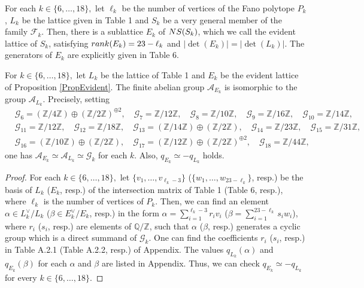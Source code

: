 \documentclass[10pt,a4paper]{amsart}
\begin{document}
\begin{prop}\label{PropEvident}
For each $k\in \{6,\ldots, 18\},$
let $\ell_k$ be the number of  vertices of the Fano polytope  $P_k$,
 $L_k$ be the lattice given in Table 1
 and $S_k$ be a very general member of the family $\mathscr{F}_k$.
Then, there is a sublattice $E_k$ of ${\rm NS}(S_k)$,
which we call the evident lattice of  $S_k$,
satisfying ${\rm rank} (E_k) =23 - \ell_k$ and $|\det (E_k)| = |\det(L_k)|.$
The generators of $E_k$ are explicitly  given in Table 6.
\end{prop}

\begin{lem}\label{LemFinAbel}
For $k\in\{6,\ldots, 18\},$ let $L_k$ be the lattice of Table 1 and $E_k$ be the evident lattice of Proposition \ref{PropEvident}.
The finite abelian group $\mathscr{A}_{E_k}$ is isomorphic to the group $\mathscr{A}_{L_k}.$ 
Precisely,  setting  
\begin{align*}
& 
\mathcal{G}_6=(\mathbb{Z}/4\mathbb{Z})\oplus (\mathbb{Z}/2\mathbb{Z})^{ \oplus 2} ,\quad 
\mathcal{G}_7=\mathbb{Z}/12 \mathbb{Z}, \quad
\mathcal{G}_8 = \mathbb{Z}/10 \mathbb{Z}, \quad 
\mathcal{G}_9 =\mathbb{Z}/16 \mathbb{Z}, \quad
\mathcal{G}_{10}=\mathbb{Z}/14 \mathbb{Z},
\\
&
\mathcal{G}_{11}=\mathbb{Z}/12 \mathbb{Z}, \quad
\mathcal{G}_{12}=\mathbb{Z}/18 \mathbb{Z}, \quad
\mathcal{G}_{13}=(\mathbb{Z}/14 \mathbb{Z})\oplus (\mathbb{Z}/2 \mathbb{Z}), \quad
\mathcal{G}_{14}=\mathbb{Z}/23 \mathbb{Z},\quad
\mathcal{G}_{15}=\mathbb{Z}/31 \mathbb{Z},\\
&
\mathcal{G}_{16}=(\mathbb{Z}/10\mathbb{Z})\oplus (\mathbb{Z}/2 \mathbb{Z}),\quad
\mathcal{G}_{17}=(\mathbb{Z}/12 \mathbb{Z}) \oplus (\mathbb{Z}/2 \mathbb{Z})^{\oplus 2}, \quad
\mathcal{G}_{18}=\mathbb{Z}/44 \mathbb{Z},
\end{align*}
one has $\mathscr{A}_{E_k} \simeq \mathscr{A}_{L_k} \simeq \mathcal{G}_k$ for each $k$.
Also,  $q_{E_k} \simeq - q_{L_k}$ holds.
\end{lem}

\begin{proof}
For each $k\in\{6,\ldots, 18\},$
let $\{v_1,\ldots,v_{\ell_k-3}\}$ ($\{w_1,\ldots,w_{23-\ell_k}\}$,  resp.)  be the basis of $L_k$  ($E_k$, resp.)
of the intersection matrix of Table 1 
(Table 6, resp.),
where $\ell_k$ is the number of vertices of $P_k$.
Then, we can find an element 
$\alpha \in L_k^\vee / L_k$ 
($\beta\in E_k^\vee/E_k$, resp.) 
in the form
$\alpha = \sum_{i=1}^{\ell_k-3} r_i v_i $
($\beta = \sum_{i=1}^{23-\ell_k} s_i w_i $),
where $r_i$ ($s_i$, resp.) are elements of $\mathbb{Q}/\mathbb{Z}$,
such that $\alpha $ ($\beta$, resp.) generates a cyclic group which is a direct summand of $\mathcal{G}_k$.
One can find the coefficients $r_i$ ($s_i$, resp.) in Table A.2.1 (Table A.2.2, resp.) of Appendix.
The values $q_{L_k}(\alpha)$ and $q_{E_k}(\beta)$ for each $\alpha$ and $\beta$ are listed in Appendix.
Thus, we can check $q_{E_k} \simeq - q_{L_k}$ for every $k\in \{6,\ldots, 18\}$.
\end{proof}
\end{document}
